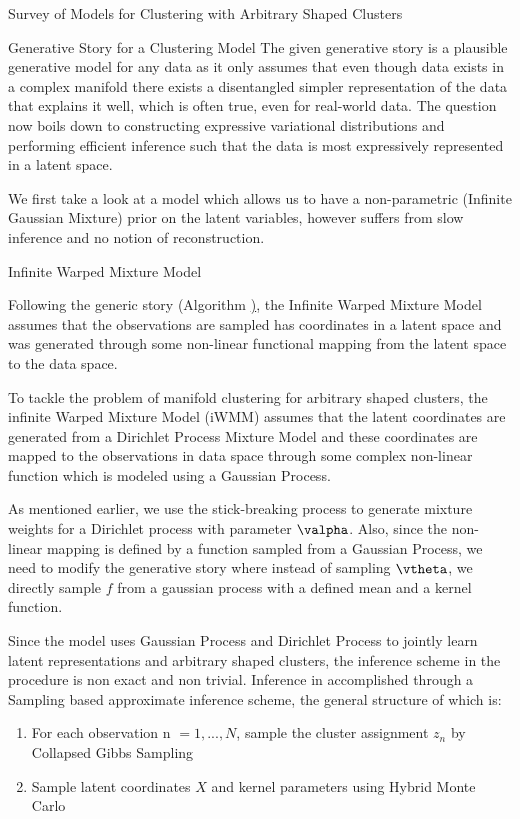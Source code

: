 \documentclass{article}
\begin{document}
\begin{psection}{Survey of Models for Clustering with Arbitrary Shaped Clusters}
\begin{algo}[0.8\textwidth]{Generative Story for a Clustering Model}
		The given generative story is a plausible generative model for any data as it only assumes that even though data exists in a complex manifold there exists a disentangled simpler representation of the data that explains it well, which is often true, even for real-world data. The question now boils down to constructing expressive variational distributions and performing efficient inference such that the data is most expressively represented in a latent space.

	\end{algo}

	We first take a look at a model which allows us to have a non-parametric (Infinite Gaussian Mixture) prior on the latent variables, however suffers from slow inference and no notion of reconstruction.

	\begin{psubsection}{Infinite Warped Mixture Model}

		Following the generic story (Algorithm \hyperlink{algo:1}), the Infinite Warped Mixture Model \cite[IWMM, ][]{iwmm} assumes that the observations are sampled has coordinates in a latent space and was generated through some non-linear functional mapping from the latent space to the data space.

		To tackle the problem of manifold clustering for arbitrary shaped clusters, the infinite Warped Mixture Model (iWMM) \citep{gplvm} assumes that the latent coordinates are generated from a Dirichlet Process Mixture Model and these coordinates are mapped to the observations in data space through some complex non-linear function which is modeled using a Gaussian Process.

		As mentioned earlier, we use the stick-breaking process to generate mixture weights for a Dirichlet process with parameter $\valpha$. Also, since the non-linear mapping is defined by a function sampled from a Gaussian Process, we need to modify the generative story where instead of sampling $\vtheta$, we directly sample $f$ from a gaussian process with a defined mean and a kernel function.

		Since the model uses Gaussian Process and Dirichlet Process to jointly learn latent representations and arbitrary shaped clusters, the inference scheme in the procedure is non exact and non trivial. Inference in accomplished through a Sampling based approximate inference scheme, the general structure of which is:

		\begin{enumerate}
			\item For each observation n $= 1,...,N$, sample the cluster assignment $z_n$ by Collapsed Gibbs Sampling
			\item Sample latent coordinates $X$ and kernel parameters using Hybrid Monte Carlo
		\end{enumerate}


\end{psubsection}
\end{psection}
\end{document}
